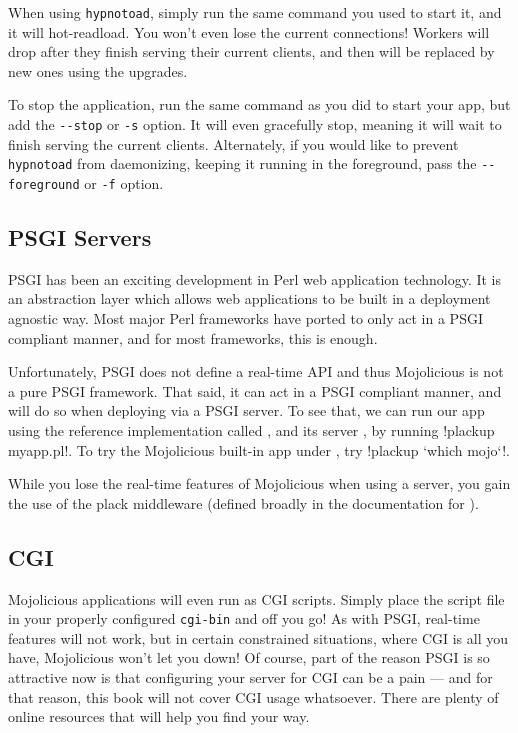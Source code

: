 When using \verb!hypnotoad!, simply run the same command you used to start it, and it will hot-readload.
You won't even lose the current connections!
Workers will drop after they finish serving their current clients, and then will be replaced by new ones using the upgrades.

To stop the application, run the same command as you did to start your app, but add the \verb!--stop! or \verb!-s! option.
It will even gracefully stop, meaning it will wait to finish serving the current clients.
Alternately, if you would like to prevent \verb!hypnotoad! from daemonizing, 
keeping it running in the foreground, pass the \verb!--foreground! or \verb!-f! option.


\subsection{PSGI Servers}

PSGI has been an exciting development in Perl web application technology.
It is an abstraction layer which allows web applications to be built in a deployment agnostic way.
Most major Perl frameworks have ported to only act in a PSGI compliant manner, and for most frameworks, this is enough.

Unfortunately, PSGI does not define a real-time API and thus Mojolicious is not a pure PSGI framework.
That said, it can act in a PSGI compliant manner, and will do so when deploying via a PSGI server.
To see that, we can run our app using the reference implementation called , and its server , by running \lstbash!plackup myapp.pl!.
To try the Mojolicious built-in app under , try \lstbash!plackup `which mojo`!.

While you lose the real-time features of Mojolicious when using a  server, you gain the use of the plack middleware
(defined broadly in the documentation for ).

\subsection{CGI}

Mojolicious applications will even run as CGI scripts.
Simply place the script file in your properly configured \verb!cgi-bin! and off you go!
As with PSGI, real-time features will not work, but in certain constrained situations, where CGI is all you have, Mojolicious won't let you down!
Of course, part of the reason PSGI is so attractive now is that configuring your server for CGI can be a pain ---
and for that reason, this book will not cover CGI usage whatsoever.
There are plenty of online resources that will help you find your way.

